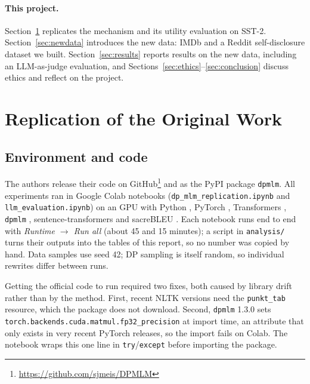 \documentclass[11pt]{article}
\begin{document}
\paragraph{This project.} Section~\ref{sec:replication} replicates the mechanism and its utility evaluation on SST-2. Section~\ref{sec:newdata} introduces the new data: IMDb \citep{maas-etal-2011-learning} and a Reddit self-disclosure dataset we built. Section~\ref{sec:results} reports results on the new data, including an LLM-as-judge evaluation, and Sections~\ref{sec:ethics}--\ref{sec:conclusion} discuss ethics and reflect on the project.

\section{Replication of the Original Work}
\label{sec:replication}

\subsection{Environment and code}
The authors release their code on GitHub\footnote{\url{https://github.com/sjmeis/DPMLM}} and as the PyPI package \texttt{dpmlm}. All experiments ran in Google Colab notebooks (\texttt{dp\_mlm\_replication.ipynb} and \texttt{llm\_evaluation.ipynb}) on an \EnvGPU{} GPU with Python \EnvPython, PyTorch \EnvTorch, Transformers \EnvTransformers, \texttt{dpmlm} \EnvDpmlm, sentence-transformers \EnvSbert{} and sacreBLEU \EnvSacrebleu{} \citep{post-2018-call}. Each notebook runs end to end with \emph{Runtime $\rightarrow$ Run all} (about 45 and 15 minutes); a script in \texttt{analysis/} turns their outputs into the tables of this report, so no number was copied by hand. Data samples use seed 42; DP sampling is itself random, so individual rewrites differ between runs.

Getting the official code to run required two fixes, both caused by library drift rather than by the method. First, recent NLTK versions need the \texttt{punkt\_tab} resource, which the package does not download. Second, \texttt{dpmlm} 1.3.0 sets \texttt{torch.backends.cuda.matmul.}\allowbreak\texttt{fp32\_precision} at import time, an attribute that only exists in very recent PyTorch releases, so the import fails on Colab. The notebook wraps this one line in \texttt{try}/\texttt{except} before importing the package.
\end{document}
